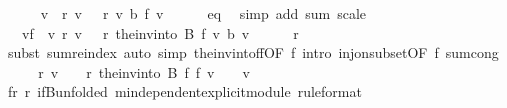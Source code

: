\begin{isabellebody}
\ \ \isamarkupfalse%
\ {\isachardoublequoteopen}{}\ {\isacharequal}{\kern0pt}\ {\isacharparenleft}{\kern0pt}{\isasymSum}v\ {\isacharbar}{\kern0pt}\ r\ v\ {\isasymnoteq}\ {}{\isachardot}{\kern0pt}\ r\ v\ {\isacharasterisk}{\kern0pt}b\ f\ v{\isacharparenright}{\kern0pt}{\isachardoublequoteclose}\isanewline
\ \ \ \ \isamarkupfalse%
\ eq{}\ \isamarkupfalse%
\ {\isacharparenleft}{\kern0pt}simp\ add{\isacharcolon}{\kern0pt}\ sum\ scale{\isacharparenright}{\kern0pt}\isanewline
\ \ \isamarkupfalse%
\ \isamarkupfalse%
\ {\isachardoublequoteopen}{\isachardot}{\kern0pt}{\isachardot}{\kern0pt}{\isachardot}{\kern0pt}\ {\isacharequal}{\kern0pt}\ {\isacharparenleft}{\kern0pt}{\isasymSum}v{\isasymin}f\ {\isacharbackquote}{\kern0pt}\ {\isacharbraceleft}{\kern0pt}v{\isachardot}{\kern0pt}\ r\ v\ {\isasymnoteq}\ {}{\isacharbraceright}{\kern0pt}{\isachardot}{\kern0pt}\ r\ {\isacharparenleft}{\kern0pt}the{\isacharunderscore}{\kern0pt}inv{\isacharunderscore}{\kern0pt}into\ B\ f\ v{\isacharparenright}{\kern0pt}\ {\isacharasterisk}{\kern0pt}b\ v{\isacharparenright}{\kern0pt}{\isachardoublequoteclose}\isanewline
\ \ \ \ \isamarkupfalse%
\ r\ \isamarkupfalse%
\ {\isacharparenleft}{\kern0pt}subst\ sum{\isachardot}{\kern0pt}reindex{\isacharparenright}{\kern0pt}\ {\isacharparenleft}{\kern0pt}auto\ simp{\isacharcolon}{\kern0pt}\ the{\isacharunderscore}{\kern0pt}inv{\isacharunderscore}{\kern0pt}into{\isacharunderscore}{\kern0pt}f{\isacharunderscore}{\kern0pt}f{\isacharbrackleft}{\kern0pt}OF\ f{\isacharbrackright}{\kern0pt}\ intro{\isacharbang}{\kern0pt}{\isacharcolon}{\kern0pt}\ inj{\isacharunderscore}{\kern0pt}on{\isacharunderscore}{\kern0pt}subset{\isacharbrackleft}{\kern0pt}OF\ f{\isacharbrackright}{\kern0pt}\ sum{\isachardot}{\kern0pt}cong{\isacharparenright}{\kern0pt}\isanewline
\ \ \isamarkupfalse%
\ \isamarkupfalse%
\ {\isachardoublequoteopen}r\ v\ {\isasymnoteq}\ {}\ {\isasymLongrightarrow}\ r\ {\isacharparenleft}{\kern0pt}the{\isacharunderscore}{\kern0pt}inv{\isacharunderscore}{\kern0pt}into\ B\ f\ {\isacharparenleft}{\kern0pt}f\ v{\isacharparenright}{\kern0pt}{\isacharparenright}{\kern0pt}\ {\isacharequal}{\kern0pt}\ {}{\isachardoublequoteclose}\ \ v\isanewline
\ \ \ \ \isamarkupfalse%
\ fr\ r\ ifB{\isacharbrackleft}{\kern0pt}unfolded\ m{}{\isachardot}{\kern0pt}independent{\isacharunderscore}{\kern0pt}explicit{\isacharunderscore}{\kern0pt}module{\isacharcomma}{\kern0pt}\ rule{\isacharunderscore}{\kern0pt}format{\isacharcomma}{\kern0pt}\isanewline

\end{isabellebody}
